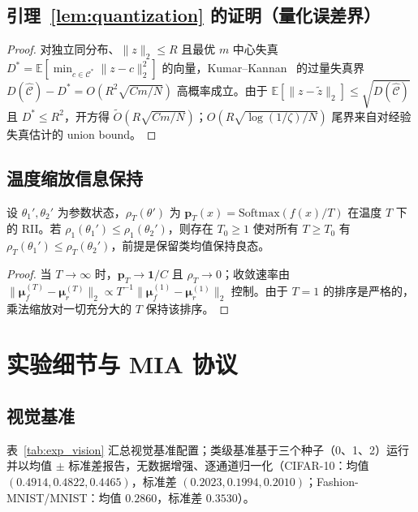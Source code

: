 \subsection{引理~\ref{lem:quantization} 的证明（量化误差界）}
\begin{proof}
对独立同分布、$\|z\|_2\le R$ 且最优 $m$ 中心失真 $D^*=\mathbb{E}[\min_{c\in\mathcal{C}^*}\|z-c\|_2^2]$ 的向量，Kumar--Kannan~\cite{kumar2010clustering} 的过量失真界 $D(\hat{\mathcal{C}})-D^*=O(R^2\sqrt{Cm/N})$ 高概率成立。由于 $\mathbb{E}[\|z-\tilde{z}\|_2]\le\sqrt{D(\hat{\mathcal{C}})}$ 且 $D^*\le R^2$，开方得 $\tilde{O}(R\sqrt{Cm/N})$；$O(R\sqrt{\log(1/\zeta)/N})$ 尾界来自对经验失真估计的 union bound。
\end{proof}

\subsection{温度缩放信息保持}
\label{app:temp}
\begin{proposition}[保序]
\label{prop:rank_preserve}
设 $\theta_1',\theta_2'$ 为参数状态，$\rho_T(\theta')$ 为 $\mathbf{p}_T(x)=\mathrm{Softmax}(f(x)/T)$ 在温度 $T$ 下的 RII。若 $\rho_1(\theta_1') \le \rho_1(\theta_2')$，则存在 $T_0\ge1$ 使对所有 $T\ge T_0$ 有 $\rho_T(\theta_1') \le \rho_T(\theta_2')$，前提是保留类均值保持良态。
\end{proposition}
\begin{proof}
当 $T\to\infty$ 时，$\mathbf{p}_T\to\mathbf{1}/C$ 且 $\rho_T\to0$；收敛速率由 $\|\boldsymbol{\mu}_f^{(T)}-\boldsymbol{\mu}_r^{(T)}\|_2\propto T^{-1}\|\boldsymbol{\mu}_f^{(1)}-\boldsymbol{\mu}_r^{(1)}\|_2$ 控制。由于 $T=1$ 的排序是严格的，乘法缩放对一切充分大的 $T$ 保持该排序。
\end{proof}

\section{实验细节与 MIA 协议}
\label{app:details}

\subsection{视觉基准}

表~\ref{tab:exp_vision} 汇总视觉基准配置；类级基准基于三个种子（0、1、2）运行并以均值 $\pm$ 标准差报告，无数据增强、逐通道归一化（CIFAR-10：均值 $(0.4914,0.4822,0.4465)$，标准差 $(0.2023,0.1994,0.2010)$；Fashion-MNIST/MNIST：均值 $0.2860$，标准差 $0.3530$）。

